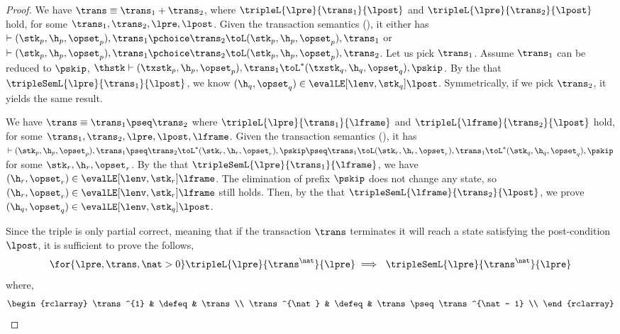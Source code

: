 \begin{proof}

We have  \(\trans \equiv \trans_{1} + \trans_{2} \), where \( \tripleL{\lpre}{\trans_{1}}{\lpost} \) and \( \tripleL{\lpre}{\trans_{2}}{\lpost} \) hold, for some \( \trans_{1}, \trans_{2}, \lpre, \lpost \).
Given the transaction semantics (), it either has \( \vdash ( \stk_{p}, \h_{p}, \opset_{p} ), \trans_{1} \pchoice \trans_{2} \toL ( \stk_{p}, \h_{p}, \opset_{p} ), \trans_{1} \) or  \( \vdash ( \stk_{p}, \h_{p}, \opset_{p} ), \trans_{1} \pchoice \trans_{2} \toL ( \stk_{p}, \h_{p}, \opset_{p} ), \trans_{2} \).
Let us pick \( \trans_{1} \).
Assume \( \trans_{1} \) can be reduced to \( \pskip \), \ie \( \thstk \vdash ( \txstk_{p}, \h_{p}, \opset_{p} ), \trans_{1}  \toL^{*} ( \txstk_{q}, \h_{q}, \opset_{q} ), \pskip \).
By the \ih that \( \tripleSemL{\lpre}{\trans_{1}}{\lpost} \), we know \( (\h_{q}, \opset_{q}) \in \evalLE[\lenv, \stk_{q}]{\lpost} \).
Symmetrically, if we pick \( \trans_{2} \), it yields the same result.


We have \( \trans \equiv \trans_{1} \pseq \trans_{2} \) where \( \tripleL{\lpre}{\trans_{1}}{\lframe} \) and \( \tripleL{\lframe}{\trans_{2}}{\lpost} \) hold, for some \( \trans_{1}, \trans_{2}, \lpre, \lpost, \lframe \).
Given the transaction semantics (), it has \( \vdash ( \stk_{p}, \h_{p}, \opset_{p} ), \trans_{1} \pseq \trans_{2} \toL^{*} ( \stk_{r}, \h_{r}, \opset_{r} ), \pskip \pseq \trans_{1} \toL ( \stk_{r}, \h_{r}, \opset_{r} ), \trans_{1} \toL^{*} ( \stk_{q}, \h_{q}, \opset_{q} ), \pskip \) for some \( \stk_{r}, \h_{r}, \opset_{r} \).
By the \ih that \( \tripleSemL{\lpre}{\trans_{1}}{\lframe} \), we have \( (\h_{r}, \opset_{r}) \in \evalLE[\lenv, \stk_{r}]{\lframe} \).
The elimination of prefix \( \pskip\) does not change any state, so \( (\h_{r}, \opset_{r}) \in \evalLE[\lenv, \stk_{r}]{\lframe} \) still holds.
Then, by the \ih that \( \tripleSemL{\lframe}{\trans_{2}}{\lpost} \), we prove \( (\h_{q}, \opset_{q}) \in \evalLE[\lenv, \stk_{q}]{\lpost} \).


Since the triple is only partial correct, meaning that if the transaction \( \trans \) terminates it will reach a state satisfying the post-condition \( \lpost \), it is sufficient to prove the follows,
\[
    \for{\lpre, \trans, \nat > 0} \tripleL{\lpre}{\trans^{\nat}}{\lpre} \implies \ \tripleSemL{\lpre}{\trans^{\nat}}{\lpre} \\
\]
where,
\[
\begin{rclarray}
    \trans^{1} & \defeq  & \trans \\
    \trans^{\nat} & \defeq  & \trans \pseq \trans^{\nat - 1} \\
\end{rclarray}
\]


\end{proof}
